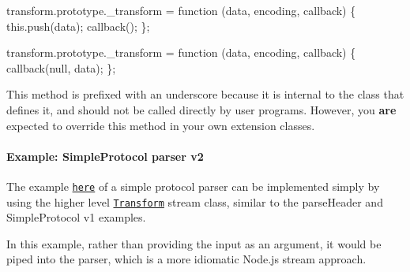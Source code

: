 \begin{DoxyCode}
transform.prototype.\_transform = function (data, encoding, callback) \{
  this.push(data);
  callback();
\};

transform.prototype.\_transform = function (data, encoding, callback) \{
  callback(null, data);
\};
\end{DoxyCode}


This method is prefixed with an underscore because it is internal to the class that defines it, and should not be called directly by user programs. However, you {\bfseries are} expected to override this method in your own extension classes.

\paragraph*{Example\+: {\ttfamily Simple\+Protocol} parser v2}

The example \href{#stream_example_simpleprotocol_v1_sub_optimal}{\tt here} of a simple protocol parser can be implemented simply by using the higher level \href{#stream_class_stream_transform}{\tt Transform} stream class, similar to the {\ttfamily parse\+Header} and {\ttfamily Simple\+Protocol v1} examples.

In this example, rather than providing the input as an argument, it would be piped into the parser, which is a more idiomatic Node.\+js stream approach.


